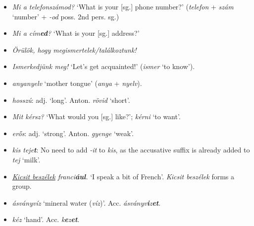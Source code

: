 \documentclass[a4paper,11pt]{article}
\begin{document}
\begin{itemize}
  \item \emph{Mi a telefonszámod?} `What is your [sg.]  phone number?'
    (\emph{telefon} + \emph{szám} `number' + \emph{-od} poss. 2nd
    pers. sg.)

  \item \emph{Mi a cím\textbf{ed}?} `What is your [sg.] address?'

  \item \emph{Örülök, hogy megismertelek/találkoztunk!}

  \item \emph{Ismerkedjünk meg!} `Let's get acquainted!'
    (\emph{ismer} `to know').

  \item \emph{anyanyelv} `mother tongue' (\emph{anya} + \emph{nyelv}).

  \item \emph{hosszú}: adj. `long'. Anton. \emph{rövid} `short'.

  \item \emph{Mit kérsz?} `What would you [sg.] like?'; \emph{kérni}
    `to want'.

  \item \emph{erős}: adj. `strong'. Anton. \emph{gyenge} `weak'.

  \item \emph{kis teje\textbf{t}}: No need to add \emph{-it} to
    \emph{kis}, as the accusative suffix is already added to
    \emph{tej} `milk'.

  \item \emph{\underline{Kicsit beszélek} franci\textbf{ául}.} `I
    speak a bit of French'. \emph{Kicsit beszélek} forms a group.

  \item \emph{ásványvíz} `mineral water
    (\emph{víz})'. Acc. \emph{ásványv\textbf{i}z\textbf{et}}.

  \item \emph{kéz} `hand'. Acc. \emph{k\textbf{e}z\textbf{et}}.


\end{itemize}
\end{document}
